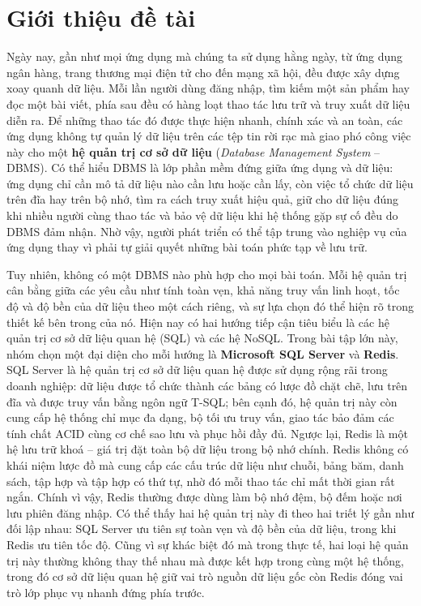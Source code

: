 \section{Giới thiệu đề tài}
\label{sec:introduction}

Ngày nay, gần như mọi ứng dụng mà chúng ta sử dụng hằng ngày, từ ứng dụng ngân hàng, trang thương mại điện tử cho đến mạng xã hội, đều được xây dựng xoay quanh dữ liệu. Mỗi lần người dùng đăng nhập, tìm kiếm một sản phẩm hay đọc một bài viết, phía sau đều có hàng loạt thao tác lưu trữ và truy xuất dữ liệu diễn ra. Để những thao tác đó được thực hiện nhanh, chính xác và an toàn, các ứng dụng không tự quản lý dữ liệu trên các tệp tin rời rạc mà giao phó công việc này cho một \textbf{hệ quản trị cơ sở dữ liệu} (\emph{Database Management System} -- DBMS). Có thể hiểu DBMS là lớp phần mềm đứng giữa ứng dụng và dữ liệu: ứng dụng chỉ cần mô tả dữ liệu nào cần lưu hoặc cần lấy, còn việc tổ chức dữ liệu trên đĩa hay trên bộ nhớ, tìm ra cách truy xuất hiệu quả, giữ cho dữ liệu đúng khi nhiều người cùng thao tác và bảo vệ dữ liệu khi hệ thống gặp sự cố đều do DBMS đảm nhận. Nhờ vậy, người phát triển có thể tập trung vào nghiệp vụ của ứng dụng thay vì phải tự giải quyết những bài toán phức tạp về lưu trữ.

Tuy nhiên, không có một DBMS nào phù hợp cho mọi bài toán. Mỗi hệ quản trị cân bằng giữa các yêu cầu như tính toàn vẹn, khả năng truy vấn linh hoạt, tốc độ và độ bền của dữ liệu theo một cách riêng, và sự lựa chọn đó thể hiện rõ trong thiết kế bên trong của nó. Hiện nay có hai hướng tiếp cận tiêu biểu là các hệ quản trị cơ sở dữ liệu quan hệ (SQL) và các hệ NoSQL. Trong bài tập lớn này, nhóm chọn một đại diện cho mỗi hướng là \textbf{Microsoft SQL Server} và \textbf{Redis}. SQL Server là hệ quản trị cơ sở dữ liệu quan hệ được sử dụng rộng rãi trong doanh nghiệp: dữ liệu được tổ chức thành các bảng có lược đồ chặt chẽ, lưu trên đĩa và được truy vấn bằng ngôn ngữ T-SQL; bên cạnh đó, hệ quản trị này còn cung cấp hệ thống chỉ mục đa dạng, bộ tối ưu truy vấn, giao tác bảo đảm các tính chất ACID cùng cơ chế sao lưu và phục hồi đầy đủ. Ngược lại, Redis là một hệ lưu trữ khoá -- giá trị đặt toàn bộ dữ liệu trong bộ nhớ chính. Redis không có khái niệm lược đồ mà cung cấp các cấu trúc dữ liệu như chuỗi, bảng băm, danh sách, tập hợp và tập hợp có thứ tự, nhờ đó mỗi thao tác chỉ mất thời gian rất ngắn. Chính vì vậy, Redis thường được dùng làm bộ nhớ đệm, bộ đếm hoặc nơi lưu phiên đăng nhập. Có thể thấy hai hệ quản trị này đi theo hai triết lý gần như đối lập nhau: SQL Server ưu tiên sự toàn vẹn và độ bền của dữ liệu, trong khi Redis ưu tiên tốc độ. Cũng vì sự khác biệt đó mà trong thực tế, hai loại hệ quản trị này thường không thay thế nhau mà được kết hợp trong cùng một hệ thống, trong đó cơ sở dữ liệu quan hệ giữ vai trò nguồn dữ liệu gốc còn Redis đóng vai trò lớp phục vụ nhanh đứng phía trước.

